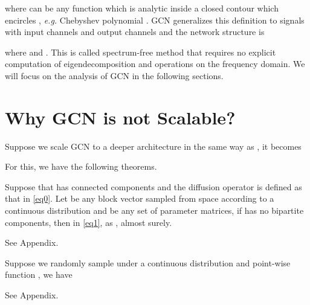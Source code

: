 \documentclass{article}
\newcommand\eg{\textit{e.g.}}
\newenvironment{theorem}[2][Theorem]{\begin{trivlist}
		\item[\hskip \labelsep {\bfseries #1}\hskip \labelsep {\bfseries #2.}]}{\end{trivlist}}
\newenvironment{proof}{{\noindent\it Proof}\quad}{\hfill \par}
\begin{document}
where  can be any function which is analytic inside a closed contour which encircles , \eg{} Chebyshev polynomial \cite{defferrard2016fast}. GCN generalizes this definition to signals with  input channels and  output channels and the network structure is

where  and . This is called spectrum-free method \cite{bronstein2016geometric} that requires no explicit computation of eigendecomposition \cite{zhang2018graph} and operations on the frequency domain. We will focus on the analysis of GCN in the following sections.





\section{Why GCN is not Scalable?}
Suppose we scale GCN to a deeper architecture in the same way as \cite{kipf2016classification, li2018deeper}, it becomes

For this, we have the following theorems.
\begin{theorem} 1 \label{thm1}
Suppose that  has  connected components and the diffusion operator  is defined as that in \eqref{eq0}. Let  be any block vector sampled from space  according to a continuous distribution and  be any set of parameter matrices, if  has no bipartite components, then in \eqref{eq1}, as ,  almost surely.
\end{theorem}	
\begin{proof}
See Appendix.
\end{proof}

\begin{theorem} 2
\label{thm2}
Suppose we randomly sample  under a continuous distribution and point-wise function , we have

\end{theorem}

\begin{proof}
See Appendix.
\end{proof}
\end{document}
